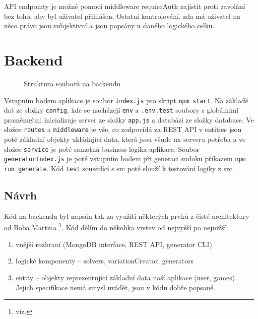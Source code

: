 \documentclass[a4paper,oneside,12pt]{report}
\begin{document}
API endpointy je možné pomocí middleware requireAuth zajistit proti zavolání bez toho, aby byl uživatel přihlášen. Ostatní kontrolování, zda má uživatel na něco právo jsou subjektivní a jsou popsány u daného logického celku.

\chapter{Backend}

\begin{figure}[H]
   \caption[Struktura souborů v src na backendu]{Struktura souborů na backendu}
   \label{fig:sqlClasses}
\end{figure}

Vstupním bodem aplikace je soubor \texttt{index.js} pro skript \texttt{npm start}. Na základě dat ze složky \texttt{config}, kde se nacházejí \texttt{env} a \texttt{.env.test} soubory s globálními proměnnými inicializuje server ze složky \texttt{app.js} a databázi ze složky database. Ve složce \texttt{routes} a \texttt{middleware} je vše, co zodpovídá za REST API v entities jsou poté základní objekty ukládající data, která jsou všude na serveru potřeba a ve složce \texttt{service} je poté samotná business logika aplikace. Soubor \texttt{generatorIndex.js} je poté vstupním bodem při generaci sudoku příkazem \texttt{npm run generate}. Kód \texttt{test} sousedící s src poté slouží k testování logiky z src. 

\section{Návrh}
Kód na backendu byl napsán tak za využití některých prvků z čisté architektury od Boba Martina \footnote{viz. }. Kód dělím do několika vrstev od nejvyšší po nejnižší:
\begin{enumerate}
   \item vnější rozhraní (MongoDB interface, REST API, generator CLI)
   \item logické komponenty -- solvers, variationCreator, generators
   \item entity -- objekty reprezentující základní data naší aplikace (user, games). Jejich specifikace nemá smysl uvádět, jsou v kódu dobře popsané.
\end{enumerate}
\end{document}
